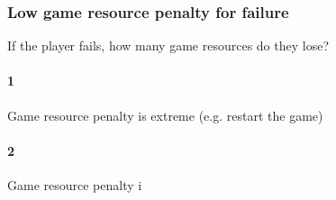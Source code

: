 \subsubsection{Low game resource penalty for failure}If the player fails, how many game resources do they lose?\paragraph{1}Game resource penalty is extreme (e.g. restart the game)\paragraph{2}Game resource penalty i